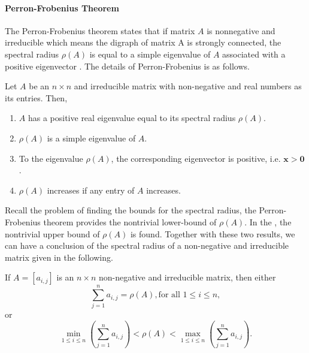 \paragraph{Perron-Frobenius Theorem}

The Perron-Frobenius theorem states that if matrix $A$ is nonnegative
and irreducible which means the digraph of matrix A is strongly connected,
the spectral radius $\rho(A)$ is equal to a simple eigenvalue of
$A$ associated with a positive eigenvector \cite{Piziak2007}. The
details of Perron-Frobenius is as follows.
\begin{thm}
\label{thm:Perron-Frobenius thm.} Let $A$ be an $n\times n$ and
irreducible matrix with non-negative and real numbers as its entries.
Then, \end{thm}
\begin{enumerate}
\item $A$ has a positive real eigenvalue equal to its spectral radius $\rho\left(A\right)$.
\item $\rho\left(A\right)$ is a simple eigenvalue of $A$.
\item To the eigenvalue $\rho\left(A\right)$, the corresponding eigenvector
is positive, i.e. $\mathbf{x}>\mathbf{0}$.
\item $\rho\left(A\right)$ increases if any entry of $A$ increases.
\end{enumerate}
Recall the problem of finding the bounds for the spectral radius,
the Perron-Frobenius theorem provides the nontrivial lower-bound of
$\rho\left(A\right)$. In the ,
the nontrivial upper bound of $\rho\left(A\right)$ is found. Together
with these two results, we can have a conclusion of the spectral radius
of a non-negative and irreducible matrix given in the following.
\begin{lem}
If $A=\left[a_{i,j}\right]$ is an $n\times n$ non-negative and irreducible
matrix, then either 
\begin{equation}
\sum_{j=1}^{n}a_{i,j}=\rho\left(A\right),\mbox{for all }1\leq i\leq n,
\end{equation}
or 
\begin{equation}
\min_{1\leq i\leq n}\left(\sum_{j=1}^{n}a_{i,j}\right)<\rho\left(A\right)<\max_{1\leq i\leq n}\left(\sum_{j=1}^{n}a_{i,j}\right).
\end{equation}
\end{lem}

